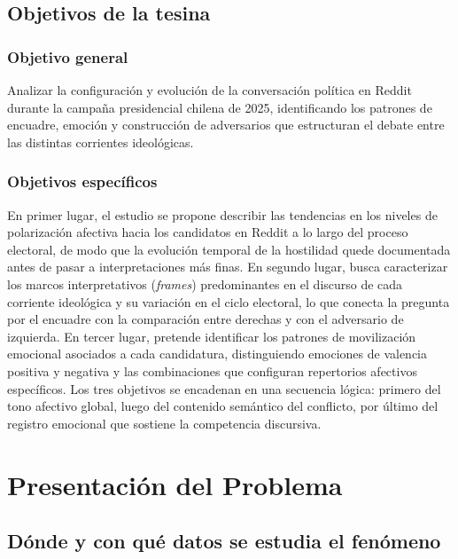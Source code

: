 \documentclass[
  letterpaper,
  numbers=noendperiod,
  fontsize=11pt,
  DIV=12,
  titlepage=false]{scrreprt}
\begin{document}
\section{Objetivos de la tesina}\label{objetivos-de-la-tesina}

\subsection{Objetivo general}\label{objetivo-general}

Analizar la configuración y evolución de la conversación política en
Reddit durante la campaña presidencial chilena de 2025, identificando
los patrones de encuadre, emoción y construcción de adversarios que
estructuran el debate entre las distintas corrientes ideológicas.

\subsection{Objetivos específicos}\label{objetivos-especuxedficos}

En primer lugar, el estudio se propone describir las tendencias en los
niveles de polarización afectiva hacia los candidatos en Reddit a lo
largo del proceso electoral, de modo que la evolución temporal de la
hostilidad quede documentada antes de pasar a interpretaciones más
finas. En segundo lugar, busca caracterizar los marcos interpretativos
(\emph{frames}) predominantes en el discurso de cada corriente
ideológica y su variación en el ciclo electoral, lo que conecta la
pregunta por el encuadre con la comparación entre derechas y con el
adversario de izquierda. En tercer lugar, pretende identificar los
patrones de movilización emocional asociados a cada candidatura,
distinguiendo emociones de valencia positiva y negativa y las
combinaciones que configuran repertorios afectivos específicos. Los tres
objetivos se encadenan en una secuencia lógica: primero del tono
afectivo global, luego del contenido semántico del conflicto, por último
del registro emocional que sostiene la competencia discursiva.


\chapter{Presentación del Problema}\label{presentaciuxf3n-del-problema}

\section{Dónde y con qué datos se estudia el
fenómeno}\label{duxf3nde-y-con-quuxe9-datos-se-estudia-el-fenuxf3meno}
\end{document}

